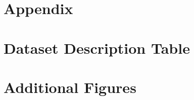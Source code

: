 \newpage
\section{Appendix}
\appendix

\section{Dataset Description Table}


\newpage

\section{Additional Figures}
